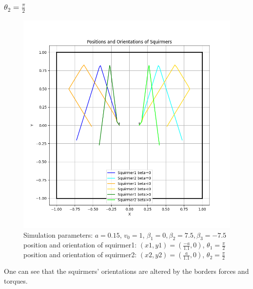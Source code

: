 \documentclass{article}
\begin{document}
\subsubsection{$\theta_2 = \frac{\pi}{2}$}
\begin{figure}[h]
   \centering
   \includegraphics[width=1\textwidth]{graphs/simulations/bordersquirmer/border_sq2.pi.2.png}
   \caption{\footnotesize Simulation parameters: $a=0.15$, $v_0=1$, $\beta_1=0, \beta_2=7.5, \beta_3=-7.5$\\
   position and orientation of squirmer1: $(x1,y1)=(\frac{-a}{1.1},0)$, $\theta_1=\frac{\pi}{2}$\\
   position and orientation of squirmer2: $(x2,y2)=(\frac{a}{1.1},0)$, $\theta_2=\frac{\pi}{2}$}
\end{figure}
One can see that the squirmers' orientations are altered by the borders forces and torques.

\newpage
\end{document}
